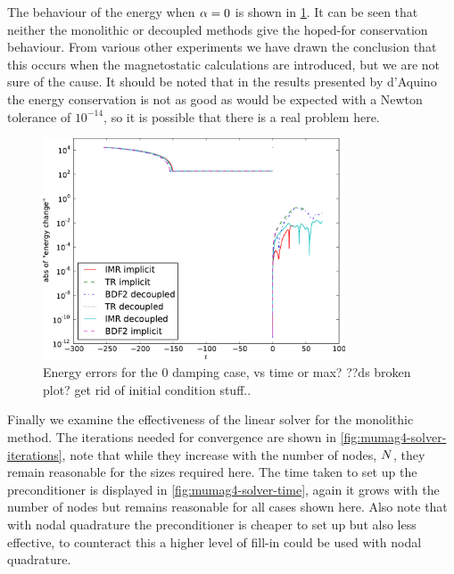 The behaviour of the energy when $\alpha = 0$ is shown in \cref{fig:energy-conservation}.
It can be seen that neither the monolithic or decoupled methods give the hoped-for conservation behaviour.
From various other experiments we have drawn the conclusion that this occurs when the magnetostatic calculations are introduced, but we are not sure of the cause.
It should be noted that in the results presented by d'Aquino \cite{DAquino2005} the energy conservation is not as good as would be expected with a Newton tolerance of $10^{-14}$, so it is possible that there is a real problem here.

\begin{figure}
  \centering
  \includegraphics[width=0.8\textwidth]{plots/sq_mumag4_energy_conservation/absofenergychangevstimes.pdf}
  \caption{Energy errors for the 0 damping case, vs time or max? ??ds broken plot? get rid of initial condition stuff..}
  \label{fig:energy-conservation}
\end{figure}



Finally we examine the effectiveness of the linear solver for the monolithic method.
The iterations needed for convergence are shown in \cref{fig:mumag4-solver-iterations}, note that while they increase with the number of nodes, $N$, they remain reasonable for the sizes required here.
The time taken to set up the preconditioner is displayed in \cref{fig:mumag4-solver-time}, again it grows with the number of nodes but remains reasonable for all cases shown here.
Also note that with nodal quadrature the preconditioner is cheaper to set up but also less effective, to counteract this a higher level of fill-in could be used with nodal quadrature.

